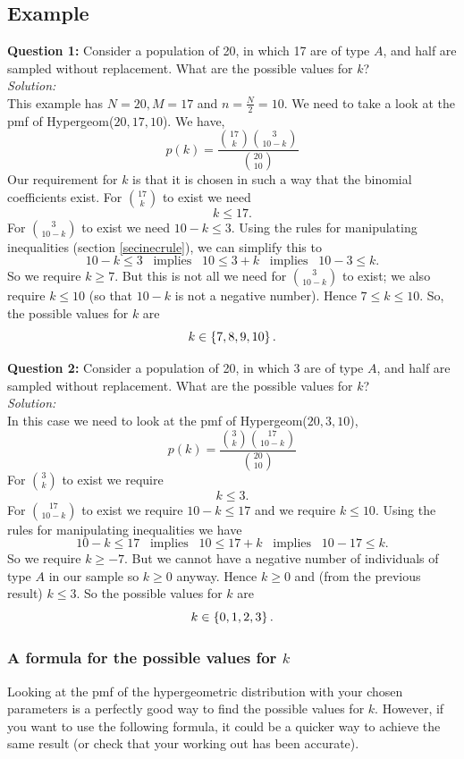 \subsection{Example}
\noindent \textbf{Question 1:} Consider a population of 20, in which 17 are of type $A$, and half are sampled without replacement. What are the possible values for $k$? \\

\noindent \textit{Solution:} \\
This example has $N = 20, M = 17$ and $n = \frac{N}{2} = 10$. We need to take a look at the pmf of Hypergeom($20,17,10$). We have,
\[
p(k) = \frac{\displaystyle{\binom{17}{k}\binom{3}{10-k}}}{\displaystyle{\binom{20}{10}}}
\]
Our requirement for $k$ is that it is chosen in such a way that the binomial coefficients exist. For $\binom{17}{k}$ to exist we need 
\[
k \leq 17.
\] 
For $\binom{3}{10-k}$ to exist we need $10 - k \leq 3$. Using the rules for manipulating inequalities (section \ref{secinecrule}), we can simplify this to
\[
10 - k \leq 3 \;\;\; \text{implies} \;\;\; 10 \leq 3 + k \;\;\; \text{implies} \;\;\; 10 - 3 \leq k.
\]
So we require $k \geq 7$. But this is not all we need for $\binom{3}{10-k}$ to exist; we also require $k \leq 10$ (so that $10-k$ is not a negative number). Hence $7 \leq k \leq 10$. So, the possible values for $k$ are
\[
k \in \left\{7,8,9,10\right\}.
\]
\bigskip

\noindent \textbf{Question 2:} Consider a population of 20, in which 3 are of type $A$, and half are sampled without replacement. What are the possible values for $k$? \\

\noindent \textit{Solution:} \\
In this case we need to look at the pmf of Hypergeom($20,3,10$),
\[
p(k) = \frac{\displaystyle{\binom{3}{k}\binom{17}{10-k}}}{\displaystyle{\binom{20}{10}}}
\]
For $\binom{3}{k}$ to exist we require 
\[
k \leq 3.
\]
For $\binom{17}{10-k}$ to exist we require $10-k \leq 17$ and we require $k \leq 10$. Using the rules for manipulating inequalities we have
\[
10 - k \leq 17 \;\;\; \text{implies} \;\;\; 10 \leq 17 + k \;\;\; \text{implies} \;\;\; 10 - 17 \leq k.
\]
So we require $k \geq -7$. But we cannot have a negative number of individuals of type $A$ in our sample so $k \geq 0$ anyway. Hence $k \geq 0$ and (from the previous result) $k \leq 3$. So the possible values for $k$ are
\[
k \in \left\{0,1,2,3\right\}.
\]

\subsubsection{A formula for the possible values for $k$}
Looking at the pmf of the hypergeometric distribution with your chosen parameters is a perfectly good way to find the possible values for $k$. However, if you want to use the following formula, it could be a quicker way to achieve the same result (or check that your working out has been accurate). \\

